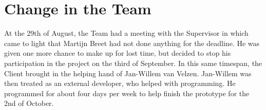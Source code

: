 \chapter{Change in the Team}
\thispagestyle{fancy}
\label{sec:teamchange}
At the 29th of August, the Team had a meeting with the Supervisor in which came to light that Martijn Breet had not done anything for the deadline. He was given one more chance to make up for lost time, but decided to stop his participation in the project on the third of September. In this same timespan, the Client brought in the helping hand of Jan-Willem van Velzen. Jan-Willem was then treated as an external developer, who helped with programming. He programmed for about four days per week to help finish the prototype for the 2nd of October. 